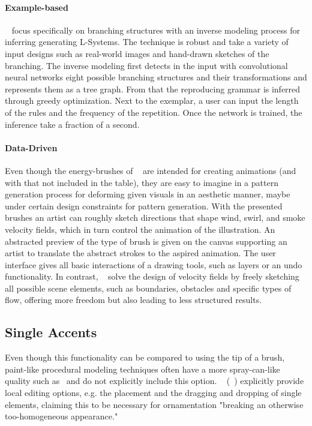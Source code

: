 \paragraph*{Example-based}
\citeauthor*{guo_2020_ipm}~\cite{guo_2020_ipm} focus specifically on branching structures with an inverse modeling process for inferring generating L-Systems. The technique is robust and take a variety of input designs such as real-world images and hand-drawn sketches of the branching. The inverse modeling first detects in the input with convolutional neural networks eight possible branching structures and their transformations and represents them as a tree graph. From that the reproducing grammar is inferred through greedy optimization. Next to the exemplar, a user can input the length of the rules and the frequency of the repetition. Once the network is trained, the inference take a fraction of a second.

\paragraph*{Data-Driven}
Even though the energy-brushes of \citeauthor*{xing_2016_eit}~\cite{xing_2016_eit} are intended for creating animations (and with that not included in the table), they are easy to imagine in a pattern generation process for deforming given visuals in an aesthetic manner, maybe under certain design constraints for pattern generation. With the presented brushes an artist can roughly sketch directions that shape wind, swirl, and smoke velocity fields, which in turn control the animation of the illustration. An abstracted preview of the type of brush is given on the canvas supporting an artist to translate the abstract strokes to the aspired animation. The user interface gives all basic interactions of a drawing tools, such as layers or an undo functionality. In contrast, \citeauthor*{hu_2019_ssf}~\cite{hu_2019_ssf} solve the design of velocity fields by freely sketching all possible scene elements, such as boundaries, obstacles and specific types of flow, offering more freedom but also leading to less structured results. 


\subsection{Single Accents}
\label{subsubsec:analysis_single_accents}

Even though this functionality can be compared to using the tip of a brush, paint-like procedural modeling techniques often have a more spray-can-like quality such as~\cite{mech_2012_tdf} and do not explicitly include this option. \citeauthor*{gieseke_2017_ooo}~\cite{gieseke_2017_ooo} (~) explicitly provide local editing options, e.g. the placement and the dragging and dropping of single elements, claiming this to be necessary for ornamentation "breaking an otherwise too-homogeneous appearance."

